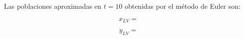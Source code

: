 \documentclass{article}
\begin{document}
Las poblaciones aproximadas en $t = 10$ obtenidas por el m\'etodo de Euler son:

\begin{equation}
    x_{LV} =
    \label{eq:res:xlv}
\end{equation}

\begin{equation}
    y_{LV} =
    \label{eq:res:ylv}
\end{equation}
\end{document}
